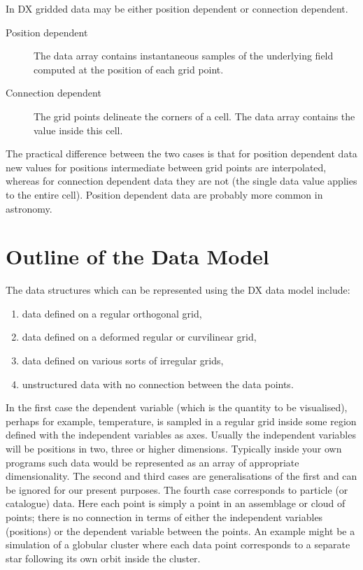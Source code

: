 \documentclass[twoside,11pt]{article}
\newcommand{\xlabel}[1]{}
\begin{document}
In DX gridded data may be either position dependent or connection
dependent.

\begin{description}

  \item[Position dependent] The data array contains instantaneous
   samples of the underlying field computed at the position of each
   grid point.

  \item[Connection dependent] The grid points delineate the corners
   of a cell. The data array contains the value inside this cell.

\end{description}

The practical difference between the two cases is that for position
dependent data new values for positions intermediate between grid points
are interpolated, whereas for connection dependent data they are not
(the single data value applies to the entire cell). Position dependent
data are probably more common in astronomy.


\section{\xlabel{OUTLINE}\label{OUTLINE}Outline of the Data Model}


The data structures which can be represented using the DX data model
include:

\begin{enumerate}

  \item data defined on a regular orthogonal grid,

  \item data defined on a deformed regular or curvilinear grid,

  \item data defined on various sorts of irregular grids,

  \item unstructured data with no connection between the data points.

\end{enumerate}

In the first case the dependent variable (which is the quantity to be
visualised), perhaps for example, temperature, is sampled in a regular
grid inside some region defined with the independent variables as axes.
Usually the independent variables will be positions in two, three or
higher dimensions. Typically inside your own programs such data would be
represented as an array of appropriate dimensionality. The second and third
cases are generalisations of the first and can be ignored for our present
purposes. The fourth case corresponds to particle (or catalogue) data.
Here each point is simply a point in an assemblage or cloud of points;
there is no connection in terms of either the independent variables
(positions) or the dependent variable between the points. An example
might be a simulation of a globular cluster where each data point
corresponds to a separate star following its own orbit inside the
cluster.
\end{document}

